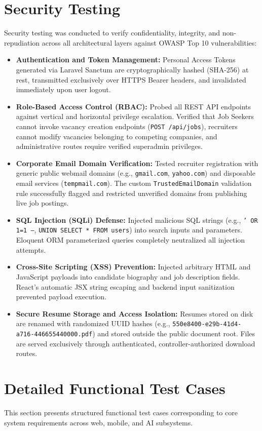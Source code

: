 \section{Security Testing}
Security testing was conducted to verify confidentiality, integrity, and non-repudiation across all architectural layers against OWASP Top 10 vulnerabilities:
\begin{itemize}
    \item \textbf{Authentication and Token Management:} Personal Access Tokens generated via Laravel Sanctum are cryptographically hashed (SHA-256) at rest, transmitted exclusively over HTTPS Bearer headers, and invalidated immediately upon user logout.
    \item \textbf{Role-Based Access Control (RBAC):} Probed all REST API endpoints against vertical and horizontal privilege escalation. Verified that Job Seekers cannot invoke vacancy creation endpoints (\texttt{POST /api/jobs}), recruiters cannot modify vacancies belonging to competing companies, and administrative routes require verified superadmin privileges.
    \item \textbf{Corporate Email Domain Verification:} Tested recruiter registration with generic public webmail domains (e.g., \texttt{gmail.com}, \texttt{yahoo.com}) and disposable email services (\texttt{tempmail.com}). The custom \texttt{TrustedEmailDomain} validation rule successfully flagged and restricted unverified domains from publishing live job postings.
    \item \textbf{SQL Injection (SQLi) Defense:} Injected malicious SQL strings (e.g., \texttt{' OR 1=1 --}, \texttt{UNION SELECT * FROM users}) into search inputs and parameters. Eloquent ORM parameterized queries completely neutralized all injection attempts.
    \item \textbf{Cross-Site Scripting (XSS) Prevention:} Injected arbitrary HTML and JavaScript payloads into candidate biography and job description fields. React's automatic JSX string escaping and backend input sanitization prevented payload execution.
    \item \textbf{Secure Resume Storage and Access Isolation:} Resumes stored on disk are renamed with randomized UUID hashes (e.g., \texttt{550e8400-e29b-41d4-a716-446655440000.pdf}) and stored outside the public document root. Files are served exclusively through authenticated, controller-authorized download routes.
\end{itemize}

\section{Detailed Functional Test Cases}
This section presents structured functional test cases corresponding to core system requirements across web, mobile, and AI subsystems.

